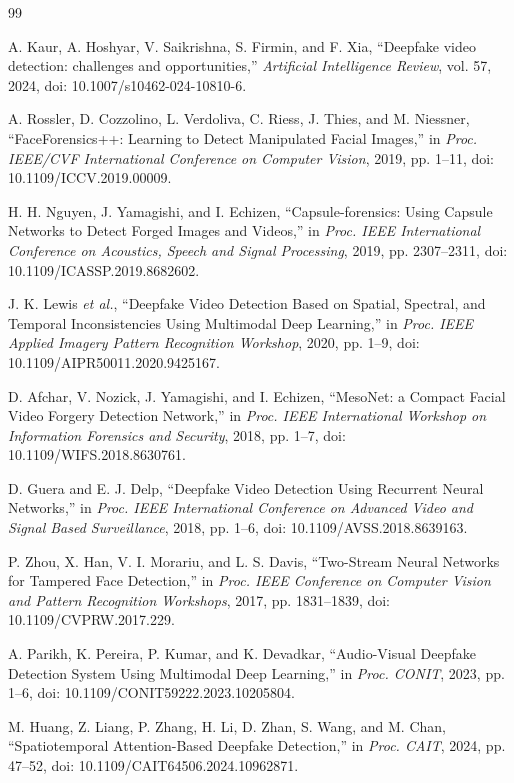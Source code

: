 \begin{thebibliography}{99}

A. Kaur, A. Hoshyar, V. Saikrishna, S. Firmin, and F. Xia, ``Deepfake video detection: challenges and opportunities,'' \emph{Artificial Intelligence Review}, vol. 57, 2024, doi: 10.1007/s10462-024-10810-6.

A. Rossler, D. Cozzolino, L. Verdoliva, C. Riess, J. Thies, and M. Niessner, ``FaceForensics++: Learning to Detect Manipulated Facial Images,'' in \emph{Proc. IEEE/CVF International Conference on Computer Vision}, 2019, pp. 1--11, doi: 10.1109/ICCV.2019.00009.

H. H. Nguyen, J. Yamagishi, and I. Echizen, ``Capsule-forensics: Using Capsule Networks to Detect Forged Images and Videos,'' in \emph{Proc. IEEE International Conference on Acoustics, Speech and Signal Processing}, 2019, pp. 2307--2311, doi: 10.1109/ICASSP.2019.8682602.

J. K. Lewis \emph{et al.}, ``Deepfake Video Detection Based on Spatial, Spectral, and Temporal Inconsistencies Using Multimodal Deep Learning,'' in \emph{Proc. IEEE Applied Imagery Pattern Recognition Workshop}, 2020, pp. 1--9, doi: 10.1109/AIPR50011.2020.9425167.

D. Afchar, V. Nozick, J. Yamagishi, and I. Echizen, ``MesoNet: a Compact Facial Video Forgery Detection Network,'' in \emph{Proc. IEEE International Workshop on Information Forensics and Security}, 2018, pp. 1--7, doi: 10.1109/WIFS.2018.8630761.

D. Guera and E. J. Delp, ``Deepfake Video Detection Using Recurrent Neural Networks,'' in \emph{Proc. IEEE International Conference on Advanced Video and Signal Based Surveillance}, 2018, pp. 1--6, doi: 10.1109/AVSS.2018.8639163.


P. Zhou, X. Han, V. I. Morariu, and L. S. Davis, ``Two-Stream Neural Networks for Tampered Face Detection,'' in \emph{Proc. IEEE Conference on Computer Vision and Pattern Recognition Workshops}, 2017, pp. 1831--1839, doi: 10.1109/CVPRW.2017.229.

A. Parikh, K. Pereira, P. Kumar, and K. Devadkar, ``Audio-Visual Deepfake Detection System Using Multimodal Deep Learning,'' in \emph{Proc. CONIT}, 2023, pp. 1--6, doi: 10.1109/CONIT59222.2023.10205804.

M. Huang, Z. Liang, P. Zhang, H. Li, D. Zhan, S. Wang, and M. Chan, ``Spatiotemporal Attention-Based Deepfake Detection,'' in \emph{Proc. CAIT}, 2024, pp. 47--52, doi: 10.1109/CAIT64506.2024.10962871.


\end{thebibliography}
